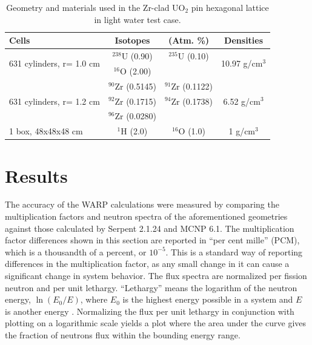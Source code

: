 \documentclass[preprint,12pt]{elsarticle}
\begin{document}
\begin{table}[h]
\centering
\caption{Geometry and materials used in the Zr-clad UO$_2$ pin hexagonal lattice in light water test case.}
\label{hex_geom}
\begin{tabular}{| l | c  c | c |}
\hline
Cells & Isotopes & (Atm. \%) & Densities \\
\hline
\multirow{2}{*}{631 cylinders, r= 1.0 cm }  &   $^{238}$U   (0.90)   &    $^{235}$U   (0.10)  &  \multirow{2}{*}{10.97 g/cm$^3$} \\
                                           &   $^{16}$O    (2.00)   &                        &  \\
\hline
\multirow{3}{*}{631 cylinders, r= 1.2 cm }  &   $^{90}$Zr   (0.5145) &    $^{91}$Zr   (0.1122)&  \multirow{3}{*}{6.52 g/cm$^3$} \\
                                           &   $^{92}$Zr   (0.1715) &    $^{94}$Zr   (0.1738)& \\
                                           &   $^{96}$Zr   (0.0280) &                        & \\
\hline
\multirow{1}{*}{1 box, 48x48x48 cm }         &   $^{1}$H     (2.0)    &   $^{16}$O  (1.0) & \multirow{1}{*}{1 g/cm$^3$} \\
\hline
\end{tabular}
\end{table}




\section{Results}
\label{sec:results}
 

The accuracy of the WARP calculations were measured by comparing the multiplication factors and neutron spectra of the aforementioned geometries against those calculated by Serpent 2.1.24 and MCNP 6.1.  The multiplication factor differences shown in this section are reported in ``per cent mille'' (PCM), which is a thousandth of a percent, or $10^{-5}$.  This is a standard way of reporting differences in the multiplication factor, as any small change in it can cause a significant change in system behavior.  The flux spectra are normalized per fission neutron and per unit lethargy.   ``Lethargy'' means the logarithm of the neutron energy, $\ln(E_0/E)$, where $E_0$ is the highest energy possible in a system and $E$ is another energy \cite{duderstadt}.  Normalizing the flux per unit lethargy in conjunction with plotting on a logarithmic scale yields a plot where the area under the curve gives the fraction of neutrons flux within the bounding energy range. 
\end{document}

